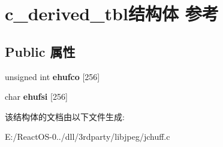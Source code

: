 \hypertarget{structc__derived__tbl}{}\section{c\+\_\+derived\+\_\+tbl结构体 参考}
\label{structc__derived__tbl}
\subsection*{Public 属性}
\begin{DoxyCompactItemize}
\item 
\mbox{\label{structc__derived__tbl_acb8d0ecc41a6d9e2d1631122368de665}} 
unsigned int {\bfseries ehufco} \mbox{[}256\mbox{]}
\item 
\mbox{\label{structc__derived__tbl_afbf7d9e461bf60c975e26af7404479ee}} 
char {\bfseries ehufsi} \mbox{[}256\mbox{]}
\end{DoxyCompactItemize}


该结构体的文档由以下文件生成\+:\begin{DoxyCompactItemize}
\item 
E\+:/\+React\+O\+S-\/0../dll/3rdparty/libjpeg/jchuff.\+c\end{DoxyCompactItemize}
